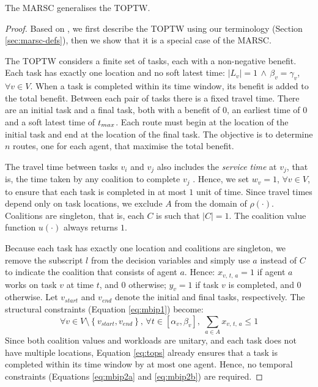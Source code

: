 \begin{theorem}\label{teo:toptw-gen}
    The MARSC generalises the TOPTW.
\end{theorem}
\begin{proof}
Based on \cite[Section $3.3$]{top2019}, we first describe the TOPTW using our terminology
(Section \ref{sec:marsc-defs}), then we show that it is a special case of the MARSC.

The TOPTW considers a finite set of tasks, each with a non-negative benefit. Each task has
exactly one location and no soft latest time: $|L_v| = 1 \,\land\, \beta_v = \gamma_v$,
$\forall v \in V$. When a task is completed within its time window, its benefit is added
to the total benefit. Between each pair of tasks there is a fixed travel time. There are
an initial task and a final task, both with a benefit of $0$, an earliest time of $0$ and
a soft latest time of $t_{max}$. Each route must begin at the location of the initial task
and end at the location of the final task. The objective is to determine $n$ routes, one
for each agent, that maximise the total benefit.

The travel time between tasks $v_i$ and $v_j$ also includes the \emph{service time} at
$v_j$, that is, the time taken by any coalition to complete $v_j$ \cite[Section
$2.2$]{top2019}. Hence, we set $w_v = 1$, $\forall v \in V$, to ensure that each task is
completed in at most $1$ unit of time. Since travel times depend only on task locations,
we exclude $A$ from the domain of $\rho(\cdot)$. Coalitions are singleton, that is, each
$C$ is such that $|C| = 1$. The coalition value function $u(\cdot)$ always returns $1$.

Because each task has exactly one location and coalitions are singleton, we remove the
subscript $l$ from the decision variables and simply use $a$ instead of $C$ to indicate
the coalition that consists of agent $a$. Hence: $x_{v,\, t,\, a} = 1$ if agent $a$ works
on task $v$ at time $t$, and $0$ otherwise; $y_v = 1$ if task $v$ is completed, and $0$
otherwise. Let $v_{start}$ and $v_{end}$ denote the initial and final tasks, respectively.
The structural constraints (Equation \ref{eq:mbip1}) become:
\begin{equation}
    \forall v \in V \setminus \left\{ v_{start}, v_{end} \right\},\,
    \forall t \in [\alpha_v, \beta_v],\;
    \sum_{a \in A} x_{v,\, t,\, a} \leq 1\label{eq:tops}
\end{equation}
Since both coalition values and workloads are unitary, and each task does not have
multiple locations, Equation \ref{eq:tops} already ensures that a task is completed within
its time window by at most one agent. Hence, no temporal constraints (Equations
\ref{eq:mbip2a} and \ref{eq:mbip2b}) are required.


\end{proof}
